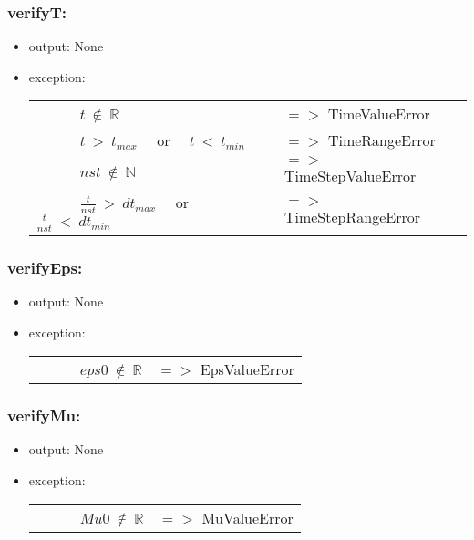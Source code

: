 \documentclass[12pt, titlepage]{article}
\begin{document}
\subsubsection*{verifyT:}
\begin{itemize}
	\item output: None
	\item exception: 
	\noindent \begin{longtable*}[l]{l l}
		\ \ \ \ \ \ $t\  \notin \  \mathbb{R}$ & $=>$ TimeValueError\\
		\ \ \ \ \ \ $ t\ >\ t_{max}$ \ \ or \ \ $t\ <\ t_{min}$ & $=>$ TimeRangeError\\
		\ \ \ \ \ \ $ nst\ \notin \  \mathbb{N}$ & $=>$ TimeStepValueError\\
		\ \ \ \ \ \ $ \frac{t}{nst}\ >\ dt_{max}$ \ \ or \ \ $\frac{t}{nst}\ <\ dt_{min}$ & $=>$ TimeStepRangeError\\
	\end{longtable*}
	
\end{itemize}

\subsubsection*{verifyEps:}
\begin{itemize}
	\item output: None
	\item exception: 
	\noindent \begin{longtable*}[l]{l l}
		\ \ \ \ \ \ $eps0\  \notin \  \mathbb{R}$ & $=>$ EpsValueError\\
	\end{longtable*}
	
\end{itemize}

\subsubsection*{verifyMu:}
\begin{itemize}
	\item output: None
	\item exception: 
	\noindent \begin{longtable*}[l]{l l}
		\ \ \ \ \ \ $Mu0\  \notin \  \mathbb{R}$ & $=>$ MuValueError\\
	\end{longtable*}
	
\end{itemize}
\end{document}
